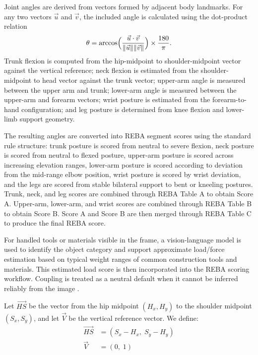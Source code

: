 \documentclass[11pt]{article}
\begin{document}
Joint angles are derived from vectors formed by adjacent body landmarks. For any two vectors \(\vec{u}\) and \(\vec{v}\), the included angle is calculated using the dot-product relation
\begin{equation}
    \theta = \arccos \Bigl( \frac{\vec{u}\cdot\vec{v}}{\|\vec{u}\| \|\vec{v}\|} \Bigr)\times \frac{180}{\pi}.
\end{equation}
Trunk flexion is computed from the hip-midpoint to shoulder-midpoint vector against the vertical reference; neck flexion is estimated from the shoulder-midpoint to head vector against the trunk vector; upper-arm angle is measured between the upper arm and trunk; lower-arm angle is measured between the upper-arm and forearm vectors; wrist posture is estimated from the forearm-to-hand configuration; and leg posture is determined from knee flexion and lower-limb support geometry.

The resulting angles are converted into REBA segment scores using the standard rule structure: trunk posture is scored from neutral to severe flexion, neck posture is scored from neutral to flexed posture, upper-arm posture is scored across increasing elevation ranges, lower-arm posture is scored according to deviation from the mid-range elbow position, wrist posture is scored by wrist deviation, and the legs are scored from stable bilateral support to bent or kneeling postures. Trunk, neck, and leg scores are combined through REBA Table A to obtain Score A. Upper-arm, lower-arm, and wrist scores are combined through REBA Table B to obtain Score B. Score A and Score B are then merged through REBA Table C to produce the final REBA score.

For handled tools or materials visible in the frame, a vision-language model is used to identify the object category and support approximate load/force estimation based on typical weight ranges of common construction tools and materials. This estimated load score is then incorporated into the REBA scoring workflow. Coupling is treated as a neutral default when it cannot be inferred reliably from the image  .
 

Let \(\vec{HS}\) be the vector from the hip midpoint \((H_x, H_y)\) to the shoulder midpoint \((S_x, S_y)\), and let \(\vec{V}\) be the vertical reference vector. We define:
\begin{align}
    \vec{HS} & = (S_x - H_x,\; S_y - H_y)\\
    \vec{V} & = (0,\; 1)
\end{align}  
\end{document}
